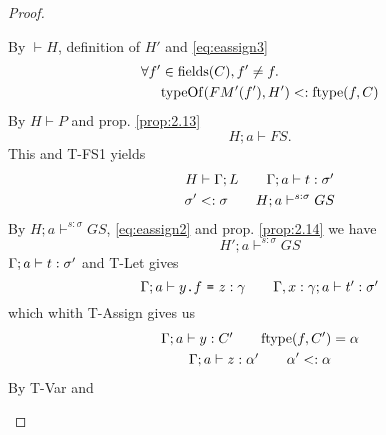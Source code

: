 \begin{proof}
\begin{description}
\begin{description}
\begin{description}
              By $\vdash H$, definition of $H'$ and \eqref{eq:eassign3}
              \begin{equation} \label{eq:eassign4}
                \begin{aligned}
                  \forall f' &\in \mbox{$\mathrm{fields}$}(C), f' \neq f. \\ 
                                 &\mbox{$\mathrm{typeOf}$}(FM'(f'), H') <: \mbox{$\mathrm{ftype}$}(f, C)
                \end{aligned}
              \end{equation}
              By $H \vdash P$ and prop. \ref{prop:2.13}
              \begin{equation} \label{eq:eassign5}
                H;a \vdash FS.
              \end{equation}
              This and {\sc T-FS1} yields
              \begin{equation}\label{eq:eassign6}
                \begin{gathered}
                  H \vdash \Gamma; L \quad\quad \mbox{$\Gamma;a\vdash t:\sigma'$} \\
                  \sigma' <: \sigma \quad\quad H; a \vdash^{s: \sigma} GS
                \end{gathered}
              \end{equation}
              By $H;a \vdash^{s: \sigma} GS$, \eqref{eq:eassign2} and prop.
              \ref{prop:2.14} we have 
              \begin{equation} \label{eq:eassign7} 
                H'; a \vdash^{s: \sigma} GS
              \end{equation}
              $\mbox{$\Gamma;a\vdash t:\sigma'$}$ and {\sc T-Let} gives
              \begin{equation} \label{eq:eassign8}
                \mbox{$\Gamma;a\vdash\mbox{\mdseries$y$\texttt{.}$f$~\texttt{=}~$z$}:\gamma$} \quad\quad
                \mbox{$\Gamma, x: \gamma;a\vdash t':\sigma'$}
              \end{equation}
              which whith {\sc T-Assign} gives us
              \begin{equation} \label{eq:eassign9}
                \begin{gathered}
                  \mbox{$\Gamma;a\vdash y:C'$} \quad\quad \mbox{$\mathrm{ftype}$}(f, C') = \alpha \\
                  \mbox{$\Gamma;a\vdash z:\alpha'$} \quad\quad \alpha' <: \alpha
                \end{gathered}
              \end{equation}
              By {\sc T-Var} and 

\end{description}
\end{description}
\end{description}
\end{proof}
